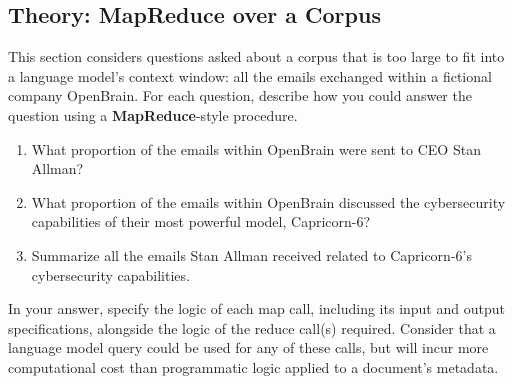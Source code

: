 \subsection{Theory: MapReduce over a Corpus}
This section considers questions asked about a corpus that is too large to fit into a language model's context window: all the emails exchanged within a fictional company OpenBrain.
For each question, describe how you could answer the question using a \textbf{MapReduce}-style procedure.

\begin{enumerate}
    \item What proportion of the emails within OpenBrain were sent to CEO Stan Allman?
    \item What proportion of the emails within OpenBrain discussed the cybersecurity capabilities of their most powerful model, Capricorn-6?
    \item Summarize all the emails Stan Allman received related to Capricorn-6's cybersecurity capabilities.
\end{enumerate}

In your answer, specify the logic of each map call, including its input and output specifications, alongside the logic of the reduce call(s) required. Consider that a language model query could be used for any of these calls, but will incur more computational cost than programmatic logic applied to a document's metadata.

